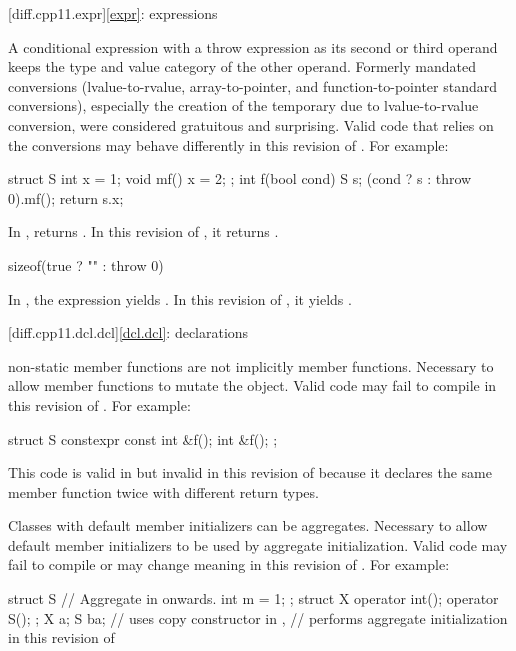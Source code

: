 [diff.cpp11.expr]{\ref{expr}: expressions}

\change
A conditional expression with a throw expression as its second or third
operand keeps the type and value category of the other operand.
\rationale
Formerly mandated conversions (lvalue-to-rvalue,
array-to-pointer, and function-to-pointer
standard conversions), especially the creation of the temporary due to
lvalue-to-rvalue conversion, were considered gratuitous and surprising.
\effect
Valid \CppXI{} code that relies on the conversions may behave differently
in this revision of \Cpp{}.
For example:
\begin{codeblock}
struct S {
  int x = 1;
  void mf() { x = 2; }
};
int f(bool cond) {
  S s;
  (cond ? s : throw 0).mf();
  return s.x;
}
\end{codeblock}
In \CppXI{},  returns . In this revision of \Cpp{},
it returns .
\begin{codeblock}
sizeof(true ? "" : throw 0)
\end{codeblock}
In \CppXI{}, the expression yields . In this
revision of \Cpp{}, it yields .

[diff.cpp11.dcl.dcl]{\ref{dcl.dcl}: declarations}

\change
{} non-static member functions are not implicitly
 member functions.
\rationale
Necessary to allow  member functions to mutate
the object.
\effect
Valid \CppXI{} code may fail to compile in this revision of \Cpp{}.
For example:
\begin{codeblock}
struct S {
  constexpr const int &f();
  int &f();
};
\end{codeblock}
This code is valid in \CppXI{}
but invalid in this revision of \Cpp{} because it declares the same member
function twice with different return types.

\change
Classes with default member initializers can be aggregates.
\rationale
Necessary to allow default member initializers to be used
by aggregate initialization.
\effect
Valid \CppXI{} code may fail to compile or may change meaning in this revision of \Cpp{}.
For example:
\begin{codeblock}
struct S {          // Aggregate in \CppXIV{} onwards.
  int m = 1;
};
struct X {
  operator int();
  operator S();
};
X a{};
S b{a};             // uses copy constructor in \CppXI{},
                    // performs aggregate initialization in this revision of \Cpp{}
\end{codeblock}

